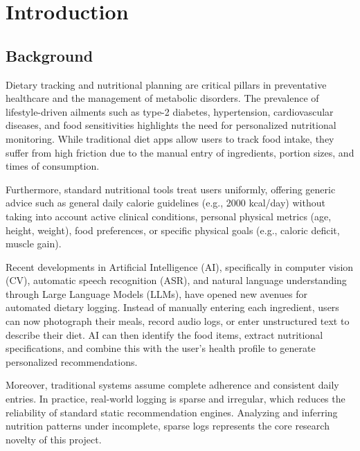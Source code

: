 \documentclass[12pt,a4paper,oneside]{report}
\begin{document}
\newpage
\tableofcontents
\listoffigures
\listoftables

\newpage
{}

\chapter{Introduction}
\label{ch:intro}

\section{Background}
Dietary tracking and nutritional planning are critical pillars in preventative healthcare and the management of metabolic disorders. The prevalence of lifestyle-driven ailments such as type-2 diabetes, hypertension, cardiovascular diseases, and food sensitivities highlights the need for personalized nutritional monitoring. While traditional diet apps allow users to track food intake, they suffer from high friction due to the manual entry of ingredients, portion sizes, and times of consumption. 

Furthermore, standard nutritional tools treat users uniformly, offering generic advice such as general daily calorie guidelines (e.g., 2000 kcal/day) without taking into account active clinical conditions, personal physical metrics (age, height, weight), food preferences, or specific physical goals (e.g., caloric deficit, muscle gain). 

Recent developments in Artificial Intelligence (AI), specifically in computer vision (CV), automatic speech recognition (ASR), and natural language understanding through Large Language Models (LLMs), have opened new avenues for automated dietary logging. Instead of manually entering each ingredient, users can now photograph their meals, record audio logs, or enter unstructured text to describe their diet. AI can then identify the food items, extract nutritional specifications, and combine this with the user's health profile to generate personalized recommendations.

Moreover, traditional systems assume complete adherence and consistent daily entries. In practice, real-world logging is sparse and irregular, which reduces the reliability of standard static recommendation engines. Analyzing and inferring nutrition patterns under incomplete, sparse logs represents the core research novelty of this project.
\end{document}
